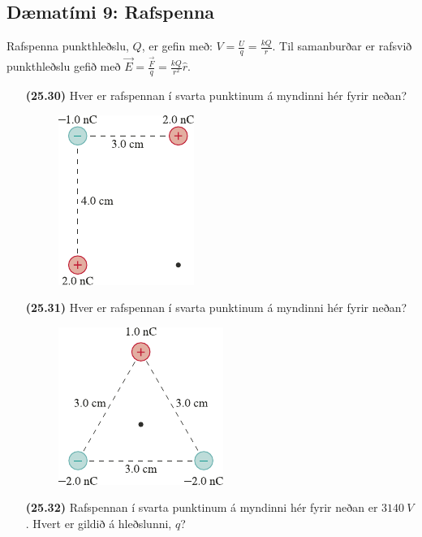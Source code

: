\newpage

\subsection*{Dæmatími 9: Rafspenna}

\begin{tcolorbox}
Rafspenna punkthleðslu, $Q$, er gefin með: $V = \frac{U}{q} = \frac{kQ}{r}$. Til samanburðar er rafsvið punkthleðslu gefið með $\vec{E} = \frac{\vec{F}}{q} = \frac{kQ}{r^2}\hat{r}$.
\end{tcolorbox}

\begin{enumerate}[label = \textbf{(\alph*)}]

\item[\textbf{(25.30)}] Hver er rafspennan í svarta punktinum á myndinni hér fyrir neðan?

\begin{figure}[H]
    \centering
    \includegraphics{figures/rk2530.pdf}
\end{figure}

\item[\textbf{(25.31)}] Hver er rafspennan í svarta punktinum á myndinni hér fyrir neðan?

\begin{figure}[H]
    \centering
    \includegraphics{figures/rk2531.pdf}
\end{figure}

\item[\textbf{(25.32)}] Rafspennan í svarta punktinum á myndinni hér fyrir neðan er $\SI{3140}{V}$. Hvert er gildið á hleðslunni, $q$?


\end{enumerate}
